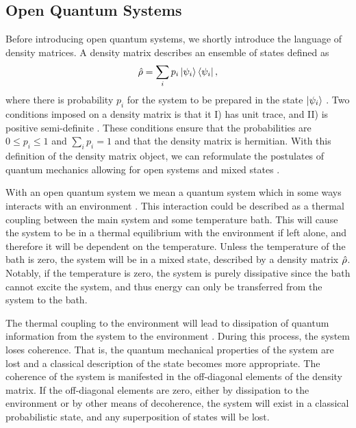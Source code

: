 \subsection{Open Quantum Systems} \label{sec:open}
Before introducing open quantum systems, we shortly introduce the language of density matrices. A density matrix describes an ensemble of states defined as 
\begin{equation}
    \hat{\rho} = \sum_i p_i \ket{\psi_i} \bra{\psi_i},
\end{equation}
where there is probability $p_i$ for the system to be prepared in the state $\ket{\psi_i}$ \cite{Nielsen:2010}. Two conditions imposed on a density matrix is that it I) has unit trace, and II) is positive semi-definite \cite{Nielsen:2010}. These conditions ensure that the probabilities are $0 \leq p_i \leq 1$ and $\sum_i p_i = 1$ and that the density matrix is hermitian. With this definition of the density matrix object, we can reformulate the postulates of quantum mechanics allowing for open systems and mixed states \cite{Nielsen:2010}.

With an open quantum system we mean a quantum system which in some ways interacts with an environment \cite{Annby-Andersson:2024}. This interaction could be described as a thermal coupling between the main system and some temperature bath. This will cause the system to be in a thermal equilibrium with the environment if left alone, and therefore it will be dependent on the temperature. Unless the temperature of the bath is zero, the system will be in a mixed state, described by a density matrix $\hat{\rho}$. Notably, if the temperature is zero, the system is purely dissipative since the bath cannot excite the system, and thus energy can only be transferred from the system to the bath. 

The thermal coupling to the environment will lead to dissipation of quantum information from the system to the environment \cite{Annby-Andersson:2024}. During this process, the system loses coherence. That is, the quantum mechanical properties of the system are lost and a classical description of the state becomes more appropriate. The coherence of the system is manifested in the off-diagonal elements of the density matrix. If the off-diagonal elements are zero, either by dissipation to the environment or by other means of decoherence, the system will exist in a classical probabilistic state, and any superposition of states will be lost. 

